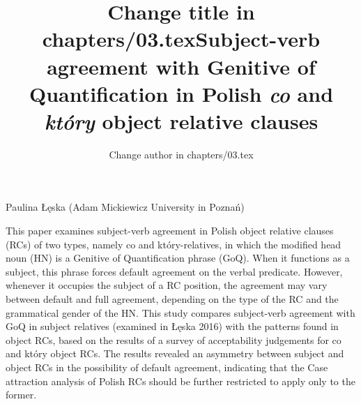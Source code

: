 \documentclass[output=paper]{langsci/langscibook}
\author{Change author in chapters/03.tex}
\title{Change title in chapters/03.tex}
\begin{document}
\title{Subject-verb agreement with Genitive of Quantification in Polish \textit{co} and \textit{który} object relative clauses}

 

 

 

 

 

 

 

 

 

Paulina Łęska (Adam Mickiewicz University in Poznań)

\begin{stylelsAbstract}
This paper examines subject-verb agreement in Polish object relative clauses (RCs) of two types, namely co and który-relatives, in which the modified head noun (HN) is a Genitive of Quantification phrase (GoQ). When it functions as a subject, this phrase forces default agreement on the verbal predicate. However, whenever it occupies the subject of a RC position, the agreement may vary between default and full agreement, depending on the type of the RC and the grammatical gender of the HN. This study compares subject-verb agreement with GoQ in subject relatives (examined in Łęska 2016) with the patterns found in object RCs, based on the results of a survey of acceptability judgements for co and który object RCs. The results revealed an asymmetry between subject and object RCs in the possibility of default agreement, indicating that the Case attraction analysis of Polish RCs should be further restricted to apply only to the former. 
\end{stylelsAbstract}
\end{document}
